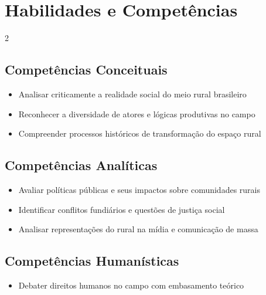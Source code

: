 \documentclass[11pt,a4paper]{article}
\begin{document}
\section*{Habilidades e Competências}

\begin{multicols}{2}

\subsection*{Competências Conceituais}

\begin{itemize}

\item Analisar criticamente a realidade social do meio rural brasileiro

\item Reconhecer a diversidade de atores e lógicas produtivas no campo

\item Compreender processos históricos de transformação do espaço rural

\end{itemize}

\subsection*{Competências Analíticas}

\begin{itemize}

\item Avaliar políticas públicas e seus impactos sobre comunidades rurais

\item Identificar conflitos fundiários e questões de justiça social

\item Analisar representações do rural na mídia e comunicação de massa

\end{itemize}

\columnbreak

\subsection*{Competências Humanísticas}

\begin{itemize}

\item Debater direitos humanos no campo com embasamento teórico


\end{itemize}
\end{multicols}
\end{document}
